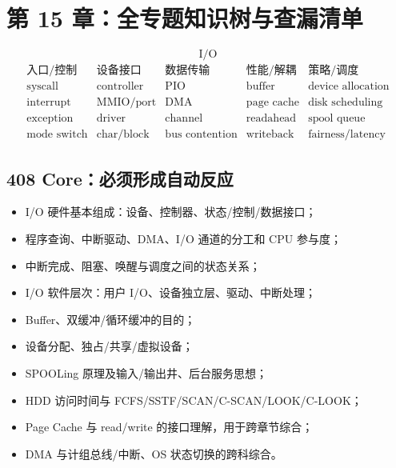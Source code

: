 \documentclass[11pt,a4paper]{ctexart}
\begin{document}
\section{第 15 章：全专题知识树与查漏清单}

\begin{corebox}[I/O 知识树]
\[
\boxed{\text{I/O}}
\]
\[
\begin{array}{lllll}
\text{入口/控制} & \text{设备接口} & \text{数据传输} & \text{性能/解耦} & \text{策略/调度}\\[0.3em]
\text{syscall} & \text{controller} & \text{PIO} & \text{buffer} & \text{device allocation}\\
\text{interrupt} & \text{MMIO/port} & \text{DMA} & \text{page cache} & \text{disk scheduling}\\
\text{exception} & \text{driver} & \text{channel} & \text{readahead} & \text{spool queue}\\
\text{mode switch} & \text{char/block} & \text{bus contention} & \text{writeback} & \text{fairness/latency}
\end{array}
\]
\end{corebox}

\subsection{408 Core：必须形成自动反应}
\begin{itemize}
  \item I/O 硬件基本组成：设备、控制器、状态/控制/数据接口；
  \item 程序查询、中断驱动、DMA、I/O 通道的分工和 CPU 参与度；
  \item 中断完成、阻塞、唤醒与调度之间的状态关系；
  \item I/O 软件层次：用户 I/O、设备独立层、驱动、中断处理；
  \item Buffer、双缓冲/循环缓冲的目的；
  \item 设备分配、独占/共享/虚拟设备；
  \item SPOOLing 原理及输入/输出井、后台服务思想；
  \item HDD 访问时间与 FCFS/SSTF/SCAN/C-SCAN/LOOK/C-LOOK；
  \item Page Cache 与 read/write 的接口理解，用于跨章节综合；
  \item DMA 与计组总线/中断、OS 状态切换的跨科综合。
\end{itemize}
\end{document}
